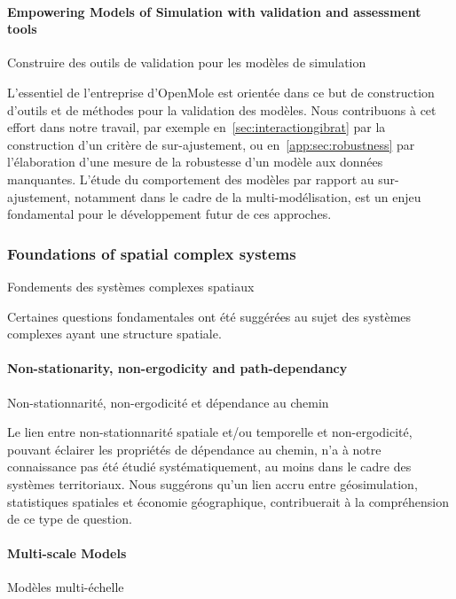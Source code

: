 \paragraph{Empowering Models of Simulation with validation and assessment tools}{Construire des outils de validation pour les modèles de simulation}



L'essentiel de l'entreprise d'OpenMole est orientée dans ce but de construction d'outils et de méthodes pour la validation des modèles. Nous contribuons à cet effort dans notre travail, par exemple en~\ref{sec:interactiongibrat} par la construction d'un critère de sur-ajustement, ou en~\ref{app:sec:robustness} par l'élaboration d'une mesure de la robustesse d'un modèle aux données manquantes. L'étude du comportement des modèles par rapport au sur-ajustement, notamment dans le cadre de la multi-modélisation, est un enjeu fondamental pour le développement futur de ces approches.





\subsubsection*{Foundations of spatial complex systems}{Fondements des systèmes complexes spatiaux}

Certaines questions fondamentales ont été suggérées au sujet des systèmes complexes ayant une structure spatiale.

\paragraph{Non-stationarity, non-ergodicity and path-dependancy}{Non-stationnarité, non-ergodicité et dépendance au chemin}


Le lien entre non-stationnarité spatiale et/ou temporelle et non-ergodicité, pouvant éclairer les propriétés de dépendance au chemin, n'a à notre connaissance pas été étudié systématiquement, au moins dans le cadre des systèmes territoriaux. Nous suggérons qu'un lien accru entre géosimulation, statistiques spatiales et économie géographique, contribuerait à la compréhension de ce type de question.



\paragraph{Multi-scale Models}{Modèles multi-échelle}


